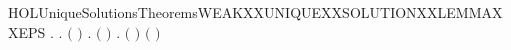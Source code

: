 \newcommand{\HOLUniqueSolutionsTheoremsWEAKXXUNIQUEXXSOLUTIONXXLEMMA}{\UseVerbatim{HOLUniqueSolutionsTheoremsWEAKXXUNIQUEXXSOLUTIONXXLEMMA}}
\begin{SaveVerbatim}{HOLUniqueSolutionsTheoremsWEAKXXUNIQUEXXSOLUTIONXXLEMMAXXEPS}
\HOLTokenTurnstile{} \HOLSymConst{\HOLTokenForall{}}.
         \HOLSymConst{\HOLTokenConj{}}   \HOLSymConst{\HOLTokenImp{}}
       \HOLSymConst{\HOLTokenForall{}} .
            \ensuremath{(} \ensuremath{)}  \HOLSymConst{\HOLTokenImp{}}
           \HOLSymConst{\HOLTokenExists{}}.   \HOLSymConst{\HOLTokenConj{}}   \HOLSymConst{\HOLTokenConj{}} \ensuremath{(} \HOLSymConst{\ensuremath{=}}  \ensuremath{)} \HOLSymConst{\HOLTokenConj{}} \HOLSymConst{\HOLTokenForall{}}.  \ensuremath{(} \ensuremath{)} \ensuremath{(} \ensuremath{)}
\end{SaveVerbatim}
\newcommand{\HOLUniqueSolutionsTheoremsWEAKXXUNIQUEXXSOLUTIONXXLEMMAXXEPS}{\UseVerbatim{HOLUniqueSolutionsTheoremsWEAKXXUNIQUEXXSOLUTIONXXLEMMAXXEPS}}
